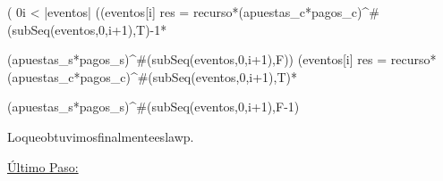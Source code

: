 \equiv ( 0\leq i < |eventos| \wedge ((eventos[i] \wedge res = recurso*(apuestas_c*pagos_c)^{\#(subSeq(eventos,0,i+1),T)-1}*
\vspace{0.2cm}

(apuestas_s*pagos_s)^{\#(subSeq(eventos,0,i+1),F)}) \vee (\neg eventos[i] \wedge  res = recurso*(apuestas_c*pagos_c)^{\#(subSeq(eventos,0,i+1),T)}*
\vspace{0.2cm}

(apuestas_s*pagos_s)^{\#(subSeq(eventos,0,i+1),F-1)}
\vspace{0.4cm}

Lo\hspace{3}que\hspace{3}obtuvimos\hspace{3}finalmente\hspace{3}es\hspace{3}la\hspace{3}wp.
\vspace{0.2cm}

\underline{\'Ultimo Paso:}

